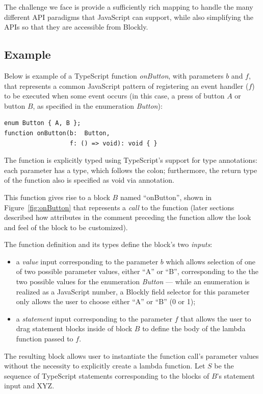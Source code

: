 The challenge we face is provide a sufficiently rich mapping to handle the
many different API paradigms that JavaScript can support, while
also simplifying the APIs so that they are accessible from Blockly. 

\subsection{Example}

Below is example of a TypeScript function \emph{onButton},
with parameters $b$ and $f$,
that represents a common JavaScript pattern of registering an event
handler ($f$) to be executed when some event occurs (in this case, 
a press of button $A$ or button $B$, as specified in the enumeration
\emph{Button}):
\begin{lstlisting}
enum Button { A, B };
function onButton(b:  Button, 
                  f: () => void): void { }
\end{lstlisting}
The function is explicitly typed using TypeScript's support for
type annotations: each parameter has a type, which follows the colon;
furthermore, the return type of the function also is specified as void
via annotation. 

This function gives rise to a 
block $B$ named ``onButton'', shown in Figure~\ref{fig:onButton}
that represents a \emph{call} to the function
(later sections described how attributes in the comment preceding
the function allow the look and feel of the block to be customized).

The function definition and its types define the block's two \emph{inputs}:
\begin{itemize}
\item  a \emph{value} input corresponding to the parameter
$b$ which allows selection of one of two 
possible parameter values, either ``A'' or ``B'', corresponding to the
the two possible values for the enumeration \emph{Button} ---
while an enumeration is realized as a JavaScript number, a 
Blockly field selector for this parameter only allows
the user to choose either ``A'' or ``B'' (0 or 1);
\item a \emph{statement} input corresponding to the parameter $f$
that allows the user to drag statement blocks inside of block $B$
to define the body of the lambda function passed to $f$.
\end{itemize}
The resulting block allows user to instantiate the function call's
parameter values without the necessity to explicitly create a 
lambda function.  Let $S$ be the sequence of TypeScript statements
corresponding to the blocks of $B$'s statement input and XYZ. 

